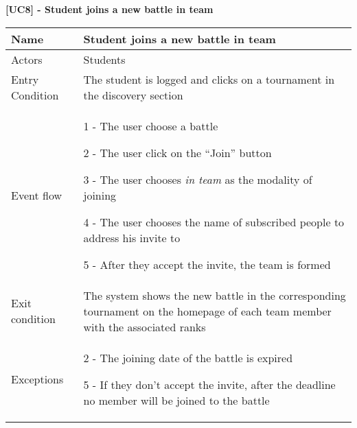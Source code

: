     \begin{table}[htb]
      \textbf{[UC8] - Student joins a new battle in team}
      
      \centering
      \begin{tabular}{|p{3cm}|p{14cm}|}
        \hline
        Name & Student joins a new battle in team \\
        \hline
        Actors & Students \\
        \hline
        Entry Condition & The student is logged and clicks on a tournament in the discovery section \\
        \hline
        Event flow &  1 - The user choose a battle
        
        2 - The user click on the ``Join'' button

        3 - The user chooses \textit{in team} as the modality of joining

        4 - The user chooses the name of subscribed people to address his invite to

        5 - After they accept the invite, the team is formed
        \\
        \hline
        Exit condition & The system shows the new battle in the corresponding tournament on the homepage of each team member with the associated ranks \\
        \hline
        Exceptions & 2 - The joining date of the battle is expired  

        5 - If they don't accept the invite, after the deadline no member will be joined to the battle
        \\
        \hline
      \end{tabular}
    \end{table}


